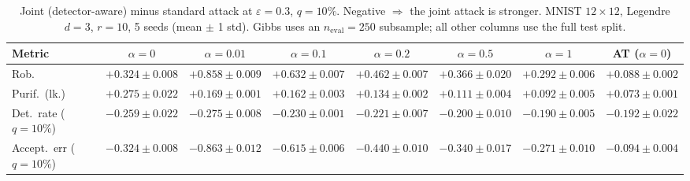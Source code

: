 \begin{table}[htbp]
  \centering
  \begin{tabular}{@{}lccccccc@{}}
    \toprule
    Metric & $\alpha{=}0$ & $\alpha{=}0.01$ & $\alpha{=}0.1$ & $\alpha{=}0.2$ & $\alpha{=}0.5$ & $\alpha{=}1$ & AT ($\alpha{=}0$) \\
    \midrule
    Rob. & $+0.324 \pm 0.008$ & $+0.858 \pm 0.009$ & $+0.632 \pm 0.007$ & $+0.462 \pm 0.007$ & $+0.366 \pm 0.020$ & $+0.292 \pm 0.006$ & $+0.088 \pm 0.002$ \\
    Purif.\ (lk.) & $+0.275 \pm 0.022$ & $+0.169 \pm 0.001$ & $+0.162 \pm 0.003$ & $+0.134 \pm 0.002$ & $+0.111 \pm 0.004$ & $+0.092 \pm 0.005$ & $+0.073 \pm 0.001$ \\
    Det.\ rate ($q{=}10\%$) & $-0.259 \pm 0.022$ & $-0.275 \pm 0.008$ & $-0.230 \pm 0.001$ & $-0.221 \pm 0.007$ & $-0.200 \pm 0.010$ & $-0.190 \pm 0.005$ & $-0.192 \pm 0.022$ \\
    Accept.\ err ($q{=}10\%$) & $-0.324 \pm 0.008$ & $-0.863 \pm 0.012$ & $-0.615 \pm 0.006$ & $-0.440 \pm 0.010$ & $-0.340 \pm 0.017$ & $-0.271 \pm 0.010$ & $-0.094 \pm 0.004$ \\
    \bottomrule
  \end{tabular}
  \caption{Joint (detector-aware) minus standard attack at $\varepsilon=0.3$, $q{=}10\%$. Negative $\Rightarrow$ the joint attack is stronger. MNIST $12\times12$, Legendre $d{=}3$, $r{=}10$, 5 seeds (mean $\pm$ 1 std). Gibbs uses an $n_{\mathrm{eval}}=250$ subsample; all other columns use the full test split.}
  \label{tab:mnist_r12_joint_r10_eps0.3}
\end{table}
